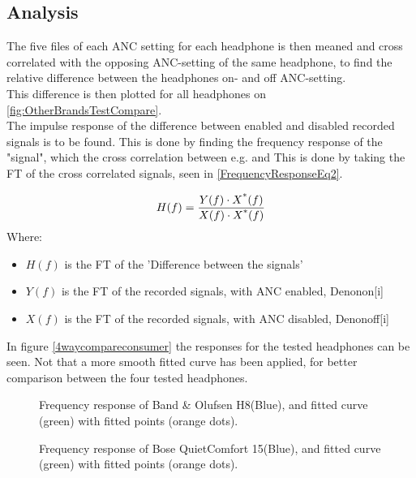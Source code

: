 \subsection{Analysis}
The five files of each ANC setting for each headphone is then meaned and cross correlated with the opposing ANC-setting of the same headphone, to find the relative difference between the headphones on- and off ANC-setting.\\
This difference is then plotted for all headphones on \autoref{fig:OtherBrandsTestCompare}.
\\
The impulse response of the difference between enabled and disabled recorded signals is to be found.
This is done by finding the frequency response of the "signal", which the cross correlation between e.g.  and  This is done by taking the FT of the cross correlated signals, seen in \autoref{FrequencyResponseEq2}.


\begin{equation}\label{FrequencyResponseEq2}
H(f) = \frac{Y(f) \cdot X\textsuperscript{*}(f)}{X(f) \cdot X\textsuperscript{*}(f)}
\end{equation}
Where:
\begin{itemize}
	\item $H(f)$ is the FT of the 'Difference between the signals'
	\item $Y(f)$ is the FT of the recorded signals, with ANC enabled,  Denonon[i]
	\item $X(f)$ is the FT of the recorded signals, with ANC disabled, Denonoff[i]
\end{itemize}

In figure \autoref{4waycompareconsumer} the responses for the tested headphones can be seen. Not that a more smooth fitted curve has been applied, for better comparison between the four tested headphones.

\begin{figure}[H]
	\centering
	
	\caption{Frequency response of Band \& Olufsen H8(Blue), and fitted curve (green) with fitted points (orange dots).}
	\label{fig:BOH8Comp}
\end{figure}

\begin{figure}[H]
	\centering
	
	\caption{Frequency response of Bose QuietComfort 15(Blue), and fitted curve (green) with fitted points (orange dots).}
	\label{fig:QC15Comp}
\end{figure}

